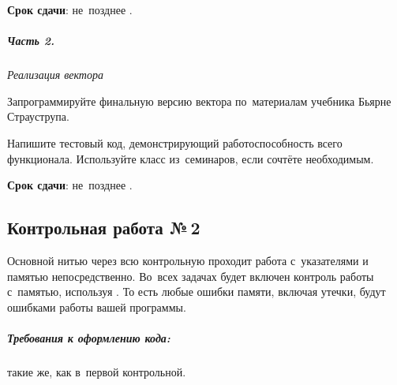 \documentclass[a4paper,11pt,landscape,notitlepage,oneside,openany,final]{memoir}
\begin{document}
\medskip

\textbf{Срок сдачи}: не~позднее .


\subparagraph{Часть 2.}
\textit{Реализация вектора}

Запрограммируйте финальную версию вектора по~материалам  учебника Бьярне Страуструпа.

Напишите тестовый код, демонстрирующий работоспособность всего функционала. Используйте класс  из~семинаров, если сочтёте необходимым.

\medskip

\textbf{Срок сдачи}: не~позднее .



\subsection{Контрольная работа №\,2}
Основной нитью через всю контрольную проходит работа с~указателями и памятью непосредственно. Во~всех задачах будет включен контроль работы с~памятью, используя . То есть любые ошибки памяти, включая утечки, будут ошибками работы вашей программы.

\subparagraph{Требования к оформлению кода:}
такие же, как в~первой контрольной.



\newenvironment{results}[1][0pt]{
    \phantom{top of the page}
    \vspace{0pt plus 1fill}

    \noindent\hspace{#1}
    \begin{minipage}{\dimexpr\textwidth-#1\relax}
}{
    \end{minipage}

    \vspace{0pt plus 1fill}
    \phantom{bottom of the page}
}


\clearpage
\renewcommand{\rightmark}{Учебный план}
\begin{results}
    
\end{results}
\end{document}
